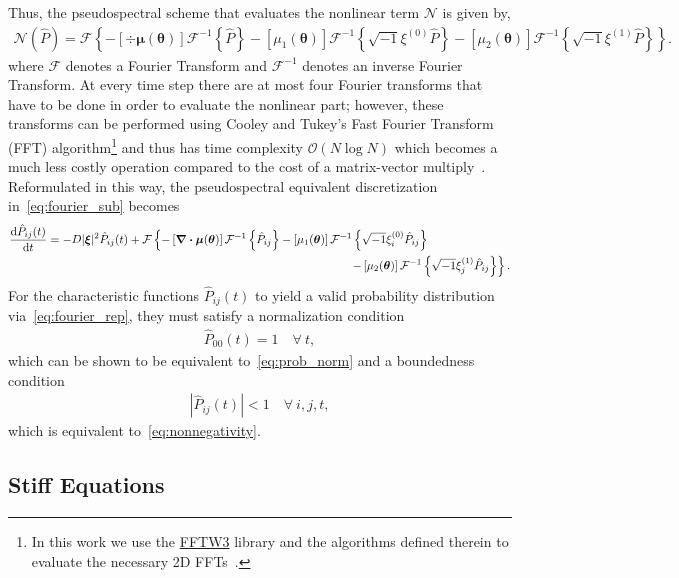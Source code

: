 \documentclass[11pt]{article}
\newcommand{\Phat}{\hat{P}}
\newcommand{\mN}{\bm{\mathcal{N}}}
\newcommand{\mF}{\mathcal{F}}
\newcommand{\mFi}{\mathcal{F}^{-1}}
\begin{document}
Thus, the pseudospectral scheme that evaluates the nonlinear term $\mN$ is given by, 
\begin{align}
    \mN(\Phat) = \mF\left\{-\left[\div{\bm{\mu}(\bm{\theta})}\right]\mFi\left\{\Phat\right\} -\left[\mu_{1}(\bm{\theta})\right]\mFi\left\{\sqrt{-1}\xi^{(0)}\Phat\right\}-\left[\mu_{2}(\bm{\theta})\right]\mFi\left\{\sqrt{-1}\xi^{(1)}\Phat\right\} \right\}.\label{eq:fourier_nonlinear}
\end{align}
where $\mF$ denotes a Fourier Transform and $\mFi$ denotes an inverse Fourier Transform. At every time step there are at most four Fourier transforms that have to be done in order to evaluate the nonlinear part; however, these transforms can be performed using Cooley and Tukey's Fast Fourier Transform (FFT) algorithm\footnote{In this work we use the \href{http://www.fftw.org/}{FFTW3} library and the algorithms defined therein to evaluate the necessary 2D FFTs~\cite{FFTW05}.} and thus has time complexity $\mathcal{O}(N\log N)$ which becomes a much less costly operation compared to the cost of a matrix-vector multiply~\cite{cooley1965}. Reformulated in this way, the pseudospectral equivalent discretization in~\eqref{eq:fourier_sub} becomes
\begin{align}
    \dv{\Phat_{ij}(t)}{t} = -D|\bm{\xi}|^{2}\Phat_{ij}(t) + \mF&\left\{-\left[\div{\bm{\mu}(\bm{\theta})}\right]\mFi\left\{\Phat_{ij}\right\} -\left[\mu_{1}(\bm{\theta})\right]\mFi\left\{\sqrt{-1}\xi^{(0)}_{i}\Phat_{ij}\right\}\right.\nonumber\\
    &\hspace{6cm}\left.-\left[\mu_{2}(\bm{\theta})\right]\mFi\left\{\sqrt{-1}\xi^{(1)}_{j}\Phat_{ij}\right\} \right\}.\label{eq:pseudospectral}
\end{align}   
For the characteristic functions $\Phat_{ij}(t)$ to yield a valid probability distribution via~\eqref{eq:fourier_rep}, they must satisfy a normalization condition
\begin{align}
    \Phat_{00}(t) = 1\quad \forall\ t,
\end{align}
which can be shown to be equivalent to~\eqref{eq:prob_norm} and a boundedness condition
\begin{align}
    |\Phat_{ij}(t)| < 1\quad\forall\ i,j,t,
\end{align}
which is equivalent to~\eqref{eq:nonnegativity}.

\subsection{Stiff Equations}
\end{document}
